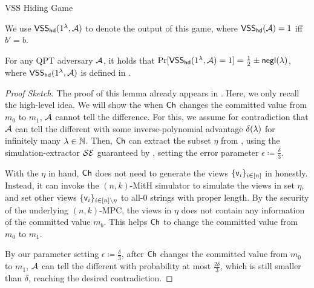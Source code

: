 \begin{ExperimentBox}[label={chall:vss:hide}]{VSS Hiding Game}

 We use $\mathsf{VSS}_{\mathsf{hd}}(1^\lambda, \mathcal{A})$ to denote the output of this game, where $\mathsf{VSS}_{\mathsf{hd}}(\mathcal{A}) = 1$ iff $b' = b$.
\end{ExperimentBox}


\begin{lemma}\label{lem:game:VSS:hiding}
For any QPT adversary $\mathcal{A}$, it holds that
$\Pr[ \mathsf{VSS}_{\mathsf{hd}}(1^\lambda, \mathcal{A}) = 1] = \frac{1}{2} \pm \mathsf{negl}(\lambda)$, 
where $\mathsf{VSS}_{\mathsf{hd}}(1^\lambda, \mathcal{A})$ is defined in .
\end{lemma}

\begin{proof}[Proof Sketch]
The proof of this lemma already appears in \cite[Section 6.5]{C:CCLY22}. Here, we only recall the high-level idea. We will show the when $\mathsf{Ch}$ changes the committed value from $m_0$ to $m_1$, $\mathcal{A}$ cannot tell the difference. For this, we assume for contradiction that $\mathcal{A}$ can tell the different with some inverse-polynomial advantage $\delta(\lambda)$ for infinitely many $\lambda \in \mathbb{N}$. Then, $\mathsf{Ch}$ can extract the subset $\eta$ from , using the simulation-extractor $\mathcal{SE}$ guaranteed by , setting the error parameter $\epsilon \coloneqq \frac{\delta}{3}$.

With the $\eta$ in hand, $\mathsf{Ch}$ does not need to generate the views $\{\mathsf{v}_i\}_{i \in [n]}$ in  honestly. Instead, it can invoke the $(n,k)$-MitH simulator to simulate the views in set $\eta$, and set other views  $\{\mathsf{v}_i\}_{i \in [n]\setminus \eta}$ to all-0 strings with proper length. By the security of the underlying $(n,k)$-MPC, the views in $\eta$ does not contain any information of the committed value $m_b$. This helps $\mathsf{Ch}$ to change the committed value from $m_0$ to $m_1$.

By our parameter setting $\epsilon \coloneqq \frac{\delta}{3}$, after $\mathsf{Ch}$ changes the committed value from $m_0$ to $m_1$, $\mathcal{A}$ can tell the different with probability at most $\frac{2\delta}{3}$, which is still smaller than $\delta$, reaching the desired contradiction. 
    
\end{proof}


